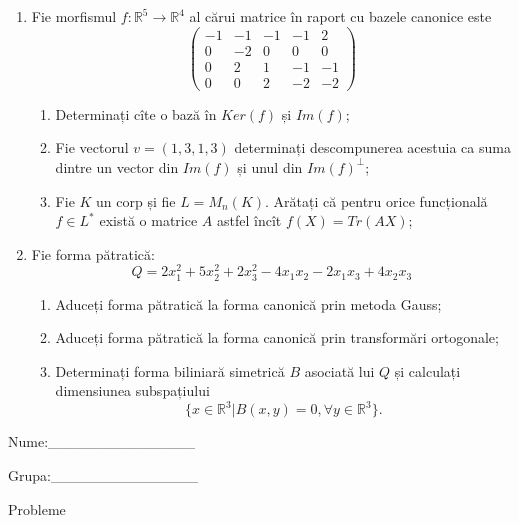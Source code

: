 \documentclass{article}
\begin{document}
\begin{enumerate}
 \item Fie morfismul $f:\mathbb{R}^5 \to \mathbb{R}^4$ al cărui matrice în raport cu bazele canonice este
$$\begin{pmatrix}
-1&-1&-1&-1&2\\
0&-2&0&0&0\\
0&2&1&-1&-1\\
0&0&2&-2&-2
\end{pmatrix}$$

\begin{enumerate}
\item Determinați cîte o bază în $Ker(f)$ și $Im(f)$;
\item Fie vectorul $v=(1,3,1,3)$ determinați descompunerea acestuia ca suma dintre un vector din $Im(f)$ și unul din $Im(f)^\perp$;
\item Fie $K$ un corp și fie $L=M_n(K)$. Arătați că pentru orice funcțională $f \in L^*$ există o matrice $A$ astfel încît $f(X)=Tr(AX)$;
\end{enumerate}
\item Fie forma pătratică:
$$Q= 2x_1^2+5x_2^2+2x_3^2-4x_1x_2-2x_1x_3+4x_2x_3$$

\begin{enumerate}
\item Aduceți forma pătratică la forma canonică prin metoda Gauss;
\item Aduceți forma pătratică la forma canonică prin transformări ortogonale;
\item Determinați forma biliniară simetrică $B$ asociată lui $Q$ și calculați dimensiunea subspațiului
$$\{x \in \mathbb{R}^3 | B(x,y)=0,\forall y \in \mathbb{R}^3\}.$$

\end{enumerate}
\end{enumerate}
\newpage
\begin{flushright}
Nume:\_\_\_\_\_\_\_\_\_\_\_\_\_\_
 
 
Grupa:\_\_\_\_\_\_\_\_\_\_\_\_\_\_
\end{flushright}
\begin{center}
\vspace{2cm}
{\Large Probleme}
\vspace{2cm}
\end{center}
\end{document}
